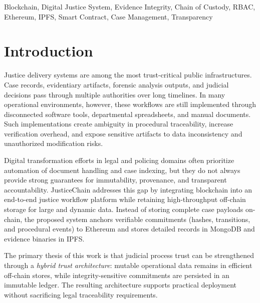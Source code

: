 \documentclass[conference]{IEEEtran}
\begin{document}
\begin{IEEEkeywords}
Blockchain, Digital Justice System, Evidence Integrity, Chain of Custody, RBAC, Ethereum, IPFS, Smart Contract, Case Management, Transparency
\end{IEEEkeywords}

\section{Introduction}
Justice delivery systems are among the most trust-critical public infrastructures. Case records, evidentiary artifacts, forensic analysis outputs, and judicial decisions pass through multiple authorities over long timelines. In many operational environments, however, these workflows are still implemented through disconnected software tools, departmental spreadsheets, and manual documents. Such implementations create ambiguity in procedural traceability, increase verification overhead, and expose sensitive artifacts to data inconsistency and unauthorized modification risks.

Digital transformation efforts in legal and policing domains often prioritize automation of document handling and case indexing, but they do not always provide strong guarantees for immutability, provenance, and transparent accountability. JusticeChain addresses this gap by integrating blockchain into an end-to-end justice workflow platform while retaining high-throughput off-chain storage for large and dynamic data. Instead of storing complete case payloads on-chain, the proposed system anchors verifiable commitments (hashes, transitions, and procedural events) to Ethereum and stores detailed records in MongoDB and evidence binaries in IPFS.

The primary thesis of this work is that judicial process trust can be strengthened through a \textit{hybrid trust architecture}: mutable operational data remains in efficient off-chain stores, while integrity-sensitive commitments are persisted in an immutable ledger. The resulting architecture supports practical deployment without sacrificing legal traceability requirements.
\end{document}

